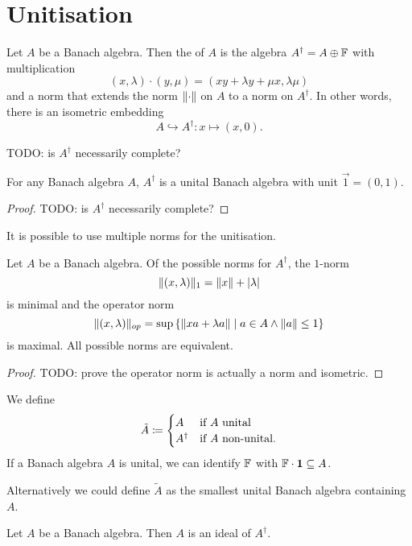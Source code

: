 \section{Unitisation}
\begin{definition}
Let $A$ be a Banach algebra. Then the  of $A$ is the algebra $A^\dagger = A\oplus \mathbb{F}$ with multiplication
\[ (x,\lambda)\cdot (y,\mu) = (xy+\lambda y + \mu x, \lambda\mu) \]
and a norm that extends the norm $\lVert\cdot\rVert$ on $A$ to a norm on $A^\dagger$. In other words, there is an isometric embedding
\[ A \hookrightarrow A^\dagger: x\mapsto (x,0). \]
\end{definition}
TODO: is $A^\dagger$ necessarily complete?
\begin{lemma}
For any Banach algebra $A$, $A^\dagger$ is a unital Banach algebra with unit $\vec{1} = (0,1)$.
\end{lemma}
\begin{proof}
TODO: is $A^\dagger$ necessarily complete?
\end{proof}
It is possible to use multiple norms for the unitisation.
\begin{proposition} \label{normsOfUnitisation}
Let $A$ be a Banach algebra. Of the possible norms for $A^\dagger$, the $1$-norm
\[ \lVert(x,\lambda)\rVert_1 = \lVert x\rVert+|\lambda| \]
is minimal and the operator norm
\[ \norm{(x,\lambda)}_{op} = \sup\setbuilder{\norm{xa + \lambda a}}{a\in A \land \norm{a}\leq 1} \]
is maximal. All possible norms are equivalent.
\end{proposition}
\begin{proof}
TODO: prove the operator norm is actually a norm and isometric.
\end{proof}

\begin{definition}
We define
\[ \tilde{A} \coloneqq \begin{cases}
A & \text{if $A$ unital} \\
A^\dagger & \text{if $A$ non-unital.}
\end{cases} \]
If a Banach algebra $A$ is unital, we can identify $\mathbb{F}$ with $\mathbb{F}\cdot \boldsymbol{\mathrm{1}} \subseteq A$.
\end{definition}

Alternatively we could define $\tilde{A}$ as the smallest unital Banach algebra containing $A$.

\begin{lemma}
Let $A$ be a Banach algebra. Then $A$ is an ideal of $A^\dagger$.
\end{lemma}

